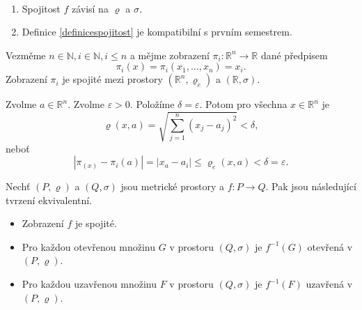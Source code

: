 \begin{poznamka}
	\,
	\begin{enumerate}[(1)]
		\item Spojitost $f$ závisí na $\varrho$ a $\sigma$.
		\item Definice \ref{definicespojitost} je kompatibilní s prvním semestrem.
\end{enumerate}
\end{poznamka}

\begin{priklad}
	Vezměme $n \in \mathbb N , i \in \mathbb N , i \leq n$ a mějme zobrazení
	$\pi_i: \mathbb R ^n \to \mathbb R $ dané předpisem
	$$
	    \pi_i(x) = \pi_i(x_1,\dots,x_n)=x_i.
	$$
	Zobrazení $\pi_i$ je spojité mezi prostory $(\mathbb R ^n, \varrho_e) $ a $(\mathbb R , \sigma)$.
	\par Zvolme $a \in \mathbb R ^n$. Zvolme $\varepsilon>0$. Položíme $\delta = \varepsilon$.
	Potom pro všechna $x \in \mathbb R ^n$ je
	$$
	    \varrho(x,a) = \sqrt{\sum_{j=1}^n (x_j-a_j)^2}<\delta,
	$$
	neboť
	$$
	    |\pi_(x)-\pi_i(a)|=|x_a-a_i|\leq \varrho_e(x,a)<\delta=\varepsilon.
	$$
\end{priklad}

\begin{veta}\label{veta9.6}
Nechť $(P,\varrho)$ a $(Q,\sigma)$ jsou metrické prostory a $f : P \to Q$. Pak jsou následující tvrzení ekvivalentní.
\begin{itemize}
    \item[(i)] Zobrazení $f$ je spojité.
    \item[(ii)] Pro každou otevřenou množinu $G$ v prostoru $(Q,\sigma)$ je $f^{-1}(G)$ otevřená v $(P,\varrho)$.
    \item[(iii)] Pro každou uzavřenou množinu $F$ v prostoru $(Q,\sigma)$ je $f^{-1}(F)$ uzavřená v $(P,\varrho)$.
\end{itemize}
\end{veta}

